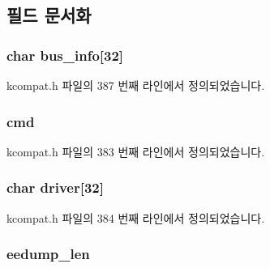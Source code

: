 \subsection{필드 문서화}
\subsubsection[{\texorpdfstring{bus\+\_\+info}{bus_info}}]{\setlength{\rightskip}{0pt plus 5cm}char bus\+\_\+info\mbox{[}32\mbox{]}}\hypertarget{structk__ethtool__drvinfo_a31896ac61b14fbde921b20c78b4df58d}{}\label{structk__ethtool__drvinfo_a31896ac61b14fbde921b20c78b4df58d}


kcompat.\+h 파일의 387 번째 라인에서 정의되었습니다.

\subsubsection[{\texorpdfstring{cmd}{cmd}}]{ cmd}\hypertarget{structk__ethtool__drvinfo_a62fe2a1dbf17d5a8561a5a7f5a97a9ba}{}\label{structk__ethtool__drvinfo_a62fe2a1dbf17d5a8561a5a7f5a97a9ba}


kcompat.\+h 파일의 383 번째 라인에서 정의되었습니다.

\subsubsection[{\texorpdfstring{driver}{driver}}]{\setlength{\rightskip}{0pt plus 5cm}char driver\mbox{[}32\mbox{]}}\hypertarget{structk__ethtool__drvinfo_afac9f4c4678975b69081b0448fff5858}{}\label{structk__ethtool__drvinfo_afac9f4c4678975b69081b0448fff5858}


kcompat.\+h 파일의 384 번째 라인에서 정의되었습니다.

\subsubsection[{\texorpdfstring{eedump\+\_\+len}{eedump_len}}]{ eedump\+\_\+len}\hypertarget{structk__ethtool__drvinfo_abbd0b2dee844b73294f6134755f8b454}{}\label{structk__ethtool__drvinfo_abbd0b2dee844b73294f6134755f8b454}


